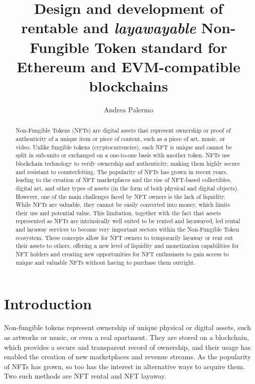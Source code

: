 \documentclass[english, LaM, oneside]{sapthesis}%
\title{Design and development of rentable and \textit{layawayable} Non-Fungible Token standard for Ethereum and EVM-compatible blockchains}
\author{Andrea Palermo}
\begin{document}
\frontmatter
\maketitle

\begin{abstract}
Non-Fungible Tokens (NFTs) are digital assets that represent ownership or proof of authenticity of a unique item or piece of content, such as a piece of art, music, or video. Unlike fungible tokens (cryptocurrencies), each NFT is unique and cannot be split in sub-units or exchanged on a one-to-one basis with another token. NFTs use blockchain technology to verify ownership and authenticity, making them highly secure and resistant to counterfeiting. The popularity of NFTs has grown in recent years, leading to the creation of NFT marketplaces and the rise of NFT-based collectibles, digital art, and other types of assets (in the form of both physical and digital objects). However, one of the main challenges faced by NFT owners is the lack of liquidity. While NFTs are valuable, they cannot be easily converted into money, which limits their use and potential value.\newline
This limitation, together with the fact that assets represented as NFTs are intrinsically well suited to be rented and layawayed, led rental and layaway services to become very important sectors within the Non-Fungible Token ecosystem. These concepts allow for NFT owners to temporarily layaway or rent out their assets to others, offering a new level of liquidity and monetization capabilities for NFT holders and creating new opportunities for NFT enthusiasts to gain access to unique and valuable NFTs without having to purchase them outright.

\end{abstract}

\tableofcontents

\mainmatter
\chapter{Introduction}
\lettrine[lines=2, findent=3pt, nindent=0pt]{N}{}on-fungible tokens represent ownership of unique physical or digital assets, such as artworks or music, or even a real apartment. They are stored on a blockchain, which provides a secure and transparent record of ownership, and their usage has enabled the creation of new marketplaces and revenue streams. As the popularity of NFTs has grown, so too has the interest in alternative ways to acquire them. Two such methods are NFT rental and NFT layaway.
\end{document}
